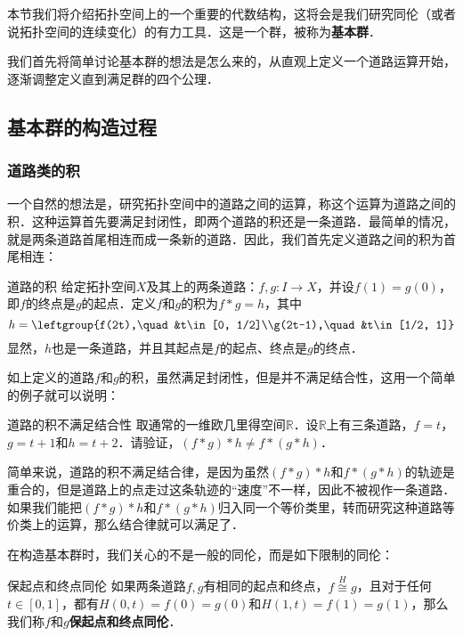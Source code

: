 
本节我们将介绍拓扑空间上的一个重要的代数结构，这将会是我们研究同伦（或者说拓扑空间的连续变化）的有力工具．这是一个群，被称为\textbf{基本群}．

我们首先将简单讨论基本群的想法是怎么来的，从直观上定义一个道路运算开始，逐渐调整定义直到满足群的四个公理．

\subsection{基本群的构造过程}
\subsubsection{道路类的积}

一个自然的想法是，研究拓扑空间中的道路之间的运算，称这个运算为道路之间的积．这种运算首先要满足封闭性，即两个道路的积还是一条道路．最简单的情况，就是两条道路首尾相连而成一条新的道路．因此，我们首先定义道路之间的积为首尾相连：

\begin{definition}{道路的积}
给定拓扑空间$X$及其上的两条道路：$f, g:I\rightarrow X$，并设$f(1)=g(0)$，即$f$的终点是$g$的起点．定义$f$和$g$的积为$f*g=h$，其中\begin{equation}h=\leftgroup{f(2t),\quad &t\in[0, 1/2]\\g(2t-1),\quad &t\in[1/2, 1]}\end{equation}
显然，$h$也是一条道路，并且其起点是$f$的起点、终点是$g$的终点．
\end{definition}

如上定义的道路$f$和$g$的积，虽然满足封闭性，但是并不满足结合性，这用一个简单的例子就可以说明：

\begin{exercise}{道路的积不满足结合性}
取通常的一维欧几里得空间$\mathbb{R}$．设$\mathbb{R}$上有三条道路，$f=t$，$g=t+1$和$h=t+2$．请验证，$(f*g)*h\not=f*(g*h)$．
\end{exercise}

简单来说，道路的积不满足结合律，是因为虽然$(f*g)*h$和$f*(g*h)$的轨迹是重合的，但是道路上的点走过这条轨迹的“速度”不一样，因此不被视作一条道路．如果我们能把$(f*g)*h$和$f*(g*h)$归入同一个等价类里，转而研究这种道路等价类上的运算，那么结合律就可以满足了．

在构造基本群时，我们关心的不是一般的同伦，而是如下限制的同伦：

\begin{definition}{保起点和终点同伦}
如果两条道路$f, g$有相同的起点和终点，$f\overset{H}{\cong}g$，且对于任何$t\in [0, 1]$，都有$H(0, t)=f(0)=g(0)$和$H(1, t)=f(1)=g(1)$，那么我们称$f$和$g$\textbf{保起点和终点同伦}．
\end{definition}


